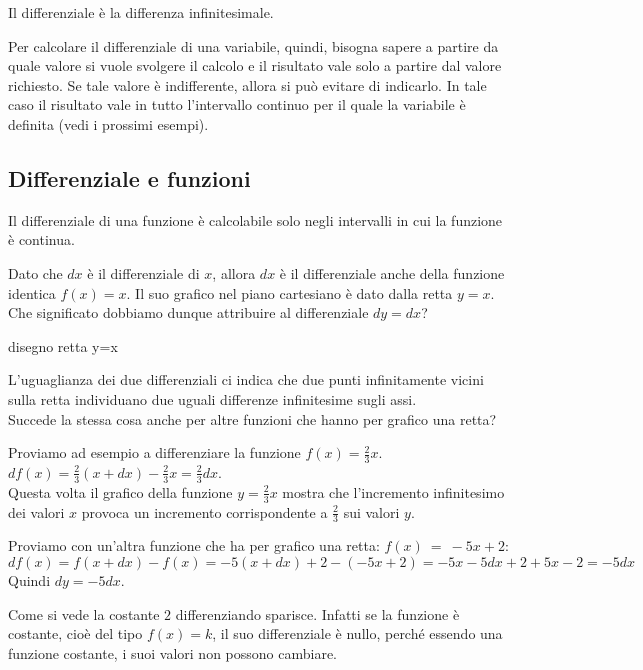 \begin{definizione}
 Il differenziale è la differenza infinitesimale.
\end{definizione}

Per calcolare il differenziale di una variabile, quindi, bisogna sapere a partire 
da quale valore si vuole svolgere il calcolo e il risultato vale solo a partire 
dal valore richiesto. Se tale valore è indifferente, allora si può evitare di 
indicarlo. In tale caso il risultato vale in tutto l'intervallo continuo per il
quale la variabile è definita (vedi i prossimi esempi).



\subsection{Differenziale e funzioni}
\label{subse:04:difffun}
\begin{osservazione}
 Il differenziale di una funzione è calcolabile solo negli intervalli in cui
 la funzione è continua.
\end{osservazione}

Dato che $dx$ è il differenziale di $x$, allora $dx$ è il differenziale anche 
della funzione identica $f(x)=x$. Il suo grafico nel piano cartesiano è dato 
dalla retta $y=x$. Che significato dobbiamo dunque attribuire al differenziale $dy=dx$?

disegno retta y=x 

L'uguaglianza dei due differenziali ci indica che due punti  infinitamente
vicini sulla retta individuano due uguali differenze infinitesime sugli assi.\\
Succede la stessa cosa anche per altre funzioni che hanno per grafico una retta?
\begin{esempio}
 Proviamo ad esempio a differenziare la funzione $f(x)=\frac{2}{3}x$.\\
\( df(x)=\frac{2}{3}(x+dx)-\frac{2}{3}x=\frac{2}{3}dx\).\\
Questa volta il grafico della funzione $y=\frac{2}{3}x$ mostra che
l'incremento infinitesimo dei valori $x$ provoca un incremento corrispondente 
a $\frac{2}{3}$ sui valori $y$.
\end{esempio}
\begin{esempio}
Proviamo con un'altra funzione che ha per grafico una retta: \(f(x)~=~-5x+2\):
\[
 df(x)= f(x+dx)-f(x)=-5(x+dx)+2-(-5x+2)=-5x-5dx+2+5x-2=-5dx
\]
Quindi $dy=-5dx$. 
\end{esempio}

Come si vede la costante $2$ differenziando sparisce. Infatti
se la funzione è costante, cioè del tipo $f(x)=k$, il suo differenziale è nullo,
perché essendo una funzione costante, i suoi valori non possono cambiare.

